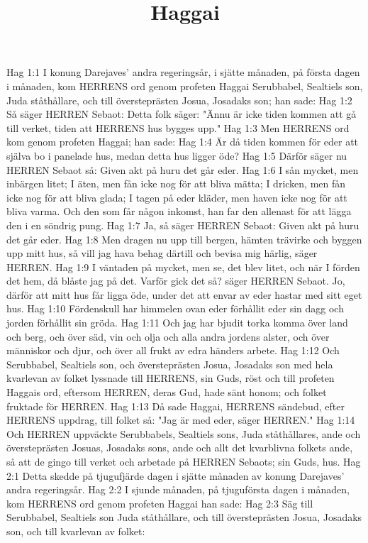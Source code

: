 

\title{Haggai}

Hag 1:1  I konung Darejaves' andra regeringsår, i sjätte månaden, på första dagen i månaden, kom HERRENS ord genom profeten Haggai Serubbabel, Sealtiels son, Juda ståthållare, och till översteprästen Josua, Josadaks son; han sade:
Hag 1:2  Så säger HERREN Sebaot: Detta folk säger: "Ännu är icke tiden kommen att gå till verket, tiden att HERRENS hus bygges upp."
Hag 1:3  Men HERRENS ord kom genom profeten Haggai; han sade:
Hag 1:4  Är då tiden kommen för eder att själva bo i panelade hus, medan detta hus ligger öde?
Hag 1:5  Därför säger nu HERREN Sebaot så: Given akt på huru det går eder.
Hag 1:6  I sån mycket, men inbärgen litet; I äten, men fån icke nog för att bliva mätta; I dricken, men fån icke nog för att bliva glada; I tagen på eder kläder, men haven icke nog för att bliva varma. Och den som får någon inkomst, han far den allenast för att lägga den i en söndrig pung.
Hag 1:7  Ja, så säger HERREN Sebaot: Given akt på huru det går eder.
Hag 1:8  Men dragen nu upp till bergen, hämten trävirke och byggen upp mitt hus, så vill jag hava behag därtill och bevisa mig härlig, säger HERREN.
Hag 1:9  I väntaden på mycket, men se, det blev litet, och när I förden det hem, då blåste jag på det. Varför gick det så? säger HERREN Sebaot. Jo, därför att mitt hus får ligga öde, under det att envar av eder hastar med sitt eget hus.
Hag 1:10  Fördenskull har himmelen ovan eder förhållit eder sin dagg och jorden förhållit sin gröda.
Hag 1:11  Och jag har bjudit torka komma över land och berg, och över säd, vin och olja och alla andra jordens alster, och över människor och djur, och över all frukt av edra händers arbete.
Hag 1:12  Och Serubbabel, Sealtiels son, och översteprästen Josua, Josadaks son med hela kvarlevan av folket lyssnade till HERRENS, sin Guds, röst och till profeten Haggais ord, eftersom HERREN, deras Gud, hade sänt honom; och folket fruktade för HERREN.
Hag 1:13  Då sade Haggai, HERRENS sändebud, efter HERRENS uppdrag, till folket så: "Jag är med eder, säger HERREN."
Hag 1:14  Och HERREN uppväckte Serubbabels, Sealtiels sons, Juda ståthållares, ande och översteprästen Josuas, Josadaks sons, ande och allt det kvarblivna folkets ande, så att de gingo till verket och arbetade på HERREN Sebaots; sin Guds, hus.
Hag 2:1  Detta skedde på tjugufjärde dagen i sjätte månaden av konung Darejaves' andra regeringsår.
Hag 2:2  I sjunde månaden, på tjuguförsta dagen i månaden, kom HERRENS ord genom profeten Haggai han sade:
Hag 2:3  Säg till Serubbabel, Sealtiels son Juda ståthållare, och till översteprästen Josua, Josadaks son, och till kvarlevan av folket:
